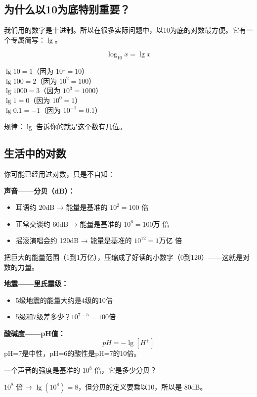 
\subsection*{为什么以10为底特别重要？}

我们用的数字是十进制。所以在很多实际问题中，以10为底的对数最方便。它有一个专属简写：$\lg$。

\[
\log_{10} x = \lg x
\]

\begin{example}
$\lg 10 = 1$（因为 $10^1=10$）\\
$\lg 100 = 2$（因为 $10^2=100$）\\
$\lg 1000 = 3$（因为 $10^3=1000$）\\
$\lg 1 = 0$（因为 $10^0=1$）\\
$\lg 0.1 = -1$（因为 $10^{-1}=0.1$）
\end{example}

规律：$\lg$ 告诉你的就是这个数有几位。

\subsection*{生活中的对数}

你可能已经用过对数，只是不自知：

\textbf{声音——分贝（dB）：}
\begin{itemize}
  \item 耳语约 20dB → 能量是基准的 $10^2=100$ 倍
  \item 正常交谈约 60dB → 能量是基准的 $10^6=100万$ 倍
  \item 摇滚演唱会约 120dB → 能量是基准的 $10^{12}=1万亿$ 倍
\end{itemize}

把巨大的能量范围（1到1万亿），压缩成了好读的小数字（0到120）——这就是对数的力量。

\textbf{地震——里氏震级：}
\begin{itemize}
  \item 5级地震的能量大约是4级的10倍
  \item 5级和7级差多少？$10^{7-5}=100$倍
\end{itemize}

\textbf{酸碱度——pH值：}
\[
pH = -\lg[H^+]
\]
pH=7是中性，pH=6的酸性是pH=7的10倍。

\begin{example}
一个声音的强度是基准的 $10^8$ 倍，它是多少分贝？
\end{example}
\begin{solution}
$10^8$ 倍 → $\lg(10^8) = 8$，但分贝的定义要乘以10，所以是 80dB。
\end{solution}

